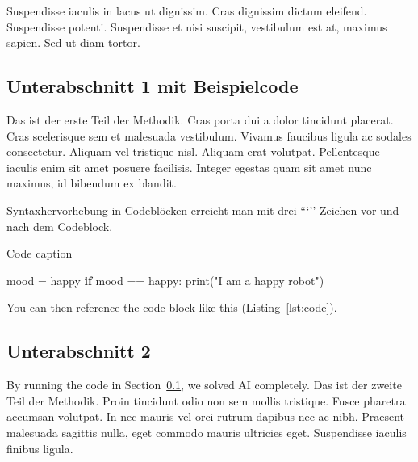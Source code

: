 \documentclass[listof=totoc,index=totoc,bibliography=totoc,12pt,german,a4paper,]{report}
\newenvironment{Shaded}{}{}
\newcommand{\BuiltInTok}[1]{\textcolor[rgb]{0.00,0.50,0.00}{#1}}
\newcommand{\ControlFlowTok}[1]{\textcolor[rgb]{0.00,0.44,0.13}{\textbf{#1}}}
\newcommand{\NormalTok}[1]{#1}
\newcommand{\OperatorTok}[1]{\textcolor[rgb]{0.40,0.40,0.40}{#1}}
\newcommand{\StringTok}[1]{\textcolor[rgb]{0.25,0.44,0.63}{#1}}
\begin{document}
Suspendisse iaculis in lacus ut dignissim. Cras dignissim dictum
eleifend. Suspendisse potenti. Suspendisse et nisi suscipit, vestibulum
est at, maximus sapien. Sed ut diam tortor.

\subsection{Unterabschnitt 1 mit Beispielcode}\label{sec:subsec-code}

Das ist der erste Teil der Methodik. Cras porta dui a dolor tincidunt
placerat. Cras scelerisque sem et malesuada vestibulum. Vivamus faucibus
ligula ac sodales consectetur. Aliquam vel tristique nisl. Aliquam erat
volutpat. Pellentesque iaculis enim sit amet posuere facilisis. Integer
egestas quam sit amet nunc maximus, id bibendum ex blandit.

Syntaxhervorhebung in Codeblöcken erreicht man mit drei ```'' Zeichen
vor und nach dem Codeblock.

\begin{codelisting}

\caption{Code caption}

\hypertarget{lst:code}{%
\label{lst:code}}%
\begin{Shaded}
\begin{Highlighting}[]
\NormalTok{mood }\OperatorTok{=} \StringTok{\textquotesingle{}happy\textquotesingle{}}
\ControlFlowTok{if}\NormalTok{ mood }\OperatorTok{==} \StringTok{\textquotesingle{}happy\textquotesingle{}}\NormalTok{:}
    \BuiltInTok{print}\NormalTok{(}\StringTok{"I am a happy robot"}\NormalTok{)}
\end{Highlighting}
\end{Shaded}

\end{codelisting}

You can then reference the code block like this
(Listing~\ref{lst:code}).

\subsection{Unterabschnitt 2}\label{unterabschnitt-2}

By running the code in Section~\ref{sec:subsec-code}, we solved AI
completely. Das ist der zweite Teil der Methodik. Proin tincidunt odio
non sem mollis tristique. Fusce pharetra accumsan volutpat. In nec
mauris vel orci rutrum dapibus nec ac nibh. Praesent malesuada sagittis
nulla, eget commodo mauris ultricies eget. Suspendisse iaculis finibus
ligula.
\end{document}
